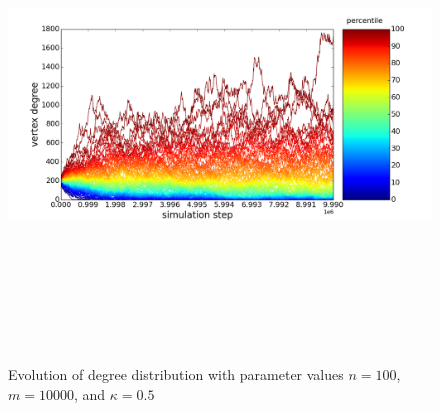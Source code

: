 \documentclass[11pt]{article}
\begin{document}
\begin{figure}[h!]
  \centering
  \includegraphics[height=130mm]{n_100_long}
  \caption{Evolution of degree distribution with parameter values $n=100$, $m=10000$, and $\kappa=0.5$}
  \label{fig:100lv}
\end{figure}
\end{document}
